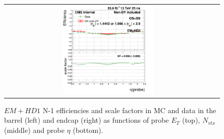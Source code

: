 \begin{figure}[bh]
\begin{center}
\begin{tabular}{cc}
      \includegraphics[width=0.45\textwidth]{figures/Zprime/2016/ScaleFactor/SameSign/N_1_eff/g_compare_cut_eta_Barrel+Endcap_ea_ta_inc_AS_N_1_EMHD1Iso_PUW.png}
    \end{tabular}
    \caption{$EM+HD1$ N-1 efficiencies and scale factors in MC and data in the barrel (left) and endcap (right) as functions of probe $E_T$ (top), $N_{vtx}$ (middle) and probe $\eta$ (bottom).}
    \label{fig:EMHD1Iso_2016}
  \end{center}
\end{figure}

